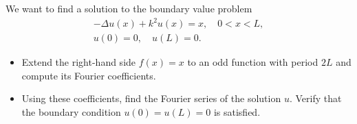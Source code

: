 \documentclass[11pt]{article}
\begin{document}
\begin{exercise}
    We want to find a solution to the boundary value problem 
    \begin{gather*}
        - \Delta u(x) + k^2 u(x) = x, \quad 0 < x < L,
        \\
        u(0) = 0, \quad u(L) = 0.
    \end{gather*}
    \begin{itemize}
        \item Extend the right-hand side $f(x) = x$ to an odd function with period $2L$ and compute its Fourier coefficients.
        \item Using these coefficients, find the Fourier series of the solution $u$. Verify that the boundary condition $u(0) = u(L) = 0$ is satisfied.
    \end{itemize}
\end{exercise}
\end{document}
